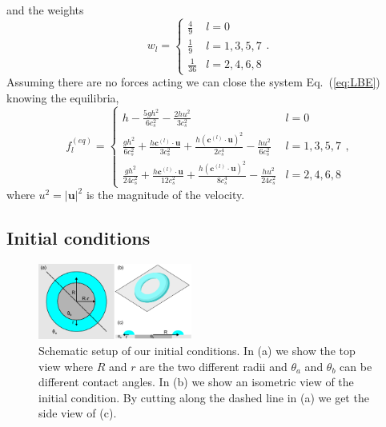 \documentclass[twoside,twocolumn,9pt]{article}
\begin{document}
and the weights
\begin{equation}\label{eq:weights}
    w_l  =
    \left\{
    \begin{array}{ll}
        \frac{4}{9} & l = 0 \\
        \frac{1}{9} &  l=1,3,5,7 \\
        \frac{1}{36} & l=2,4,6,8
    \end{array}
    \right..
\end{equation}
Assuming there are no forces acting we can close the system Eq.~(\ref{eq:LBE}) knowing the equilibria,
\begin{equation} \label{eq:equilibria}
f_l^{(eq)}  =
\left\{
\begin{array}{ll}
h - \frac{5gh^2}{6c_s^2} - \frac{2hu^2}{3c_s^2}& l = 0 \\
\frac{gh^2}{6c_s^2} + \frac{h \mathbf{c}^{(l)}\cdot \mathbf{u}}{3 c_s^2} + \frac{h(\mathbf{c}^{(l)}\cdot \mathbf{u})^2}{2 c_s^4}-\frac{hu^2}{6c_s^2} &  l=1,3,5,7 \\
\frac{gh^2}{24c_s^2} + \frac{h \mathbf{c}^{(l)}\cdot\mathbf{u}}{12 c_s^2} + \frac{h (\mathbf{c}^{(l)}\cdot\mathbf{u})^2}{8c_s^4}-\frac{hu^2}{24c_s^2} & l=2,4,6,8
\end{array}
\right.,
\end{equation}
where $u^2 = |\mathbf{u}|^2$ is the magnitude of the velocity.


\subsection{Initial conditions}
\begin{figure}
\centering
  \includegraphics[width=0.45\textwidth]{ringrivulet_shema}
  \caption{Schematic setup of our initial conditions. In (a) we show the top view where $R$ and $r$ are the two different radii and $\theta_a$ and $\theta_b$ can be different contact angles. 
  In (b) we show an isometric view of the initial condition.
  By cutting along the dashed line in (a) we get the side view of (c).}
  \label{fgr:ringschema}
\end{figure}
\end{document}
